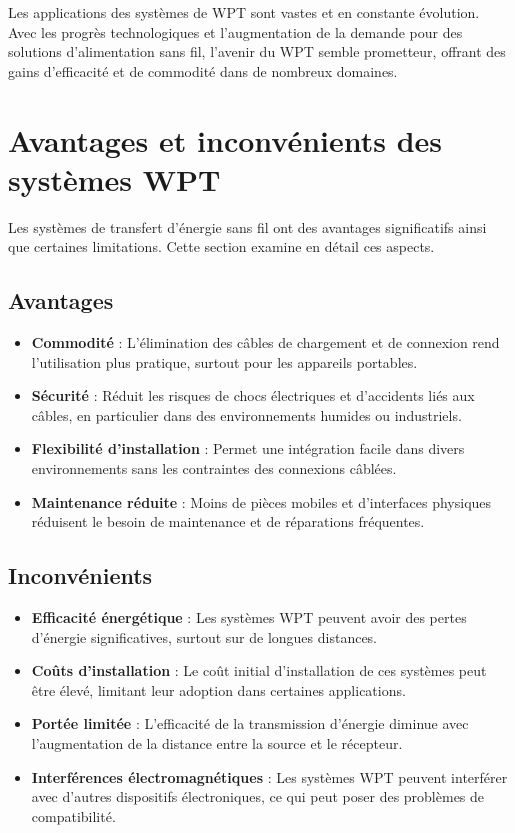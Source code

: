 \documentclass[12pt,a4paper,titlepage,notitlepage]{article}
\begin{document}
	Les applications des systèmes de WPT sont vastes et en constante évolution. Avec les progrès technologiques et l'augmentation de la demande pour des solutions d'alimentation sans fil, l'avenir du WPT semble prometteur, offrant des gains d'efficacité et de commodité dans de nombreux domaines.
	
	\section{Avantages et inconvénients des systèmes WPT}
	
	Les systèmes de transfert d'énergie sans fil ont des avantages significatifs ainsi que certaines limitations. Cette section examine en détail ces aspects.
	
	\subsection{Avantages}
	
	\begin{itemize}
		\item \textbf{Commodité} : L'élimination des câbles de chargement et de connexion rend l'utilisation plus pratique, surtout pour les appareils portables.
		\item \textbf{Sécurité} : Réduit les risques de chocs électriques et d'accidents liés aux câbles, en particulier dans des environnements humides ou industriels.
		\item \textbf{Flexibilité d'installation} : Permet une intégration facile dans divers environnements sans les contraintes des connexions câblées.
		\item \textbf{Maintenance réduite} : Moins de pièces mobiles et d'interfaces physiques réduisent le besoin de maintenance et de réparations fréquentes.
	\end{itemize}
	
	\subsection{Inconvénients}
	
	\begin{itemize}
		\item \textbf{Efficacité énergétique} : Les systèmes WPT peuvent avoir des pertes d'énergie significatives, surtout sur de longues distances.
		\item \textbf{Coûts d'installation} : Le coût initial d'installation de ces systèmes peut être élevé, limitant leur adoption dans certaines applications.
		\item \textbf{Portée limitée} : L'efficacité de la transmission d'énergie diminue avec l'augmentation de la distance entre la source et le récepteur.
		\item \textbf{Interférences électromagnétiques} : Les systèmes WPT peuvent interférer avec d'autres dispositifs électroniques, ce qui peut poser des problèmes de compatibilité.
	\end{itemize}
	
\end{document}
